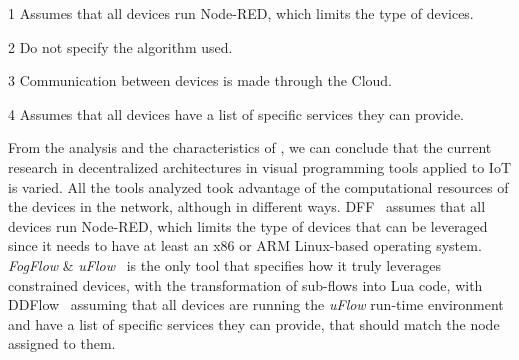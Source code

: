 \begin{table*}[!h]
    \centering
    \begin{threeparttable}
    \caption[Decentralized VPLs applied to IoT and their characteristics.]{Small circles (\textbullet) mean \textit{yes}, hyphens (-) means \textit{no information available}, empty means \textit{no} and asterisk (*) means more than one.}\label{tab:decentralized_sota_results}
    \begin{tablenotes}\footnotesize
        \item[1] Assumes that all devices run Node-RED, which limits the type of devices.
        \item[2] Do not specify the algorithm used.
        \item[3] Communication between devices is made through the Cloud.
        \item[4] Assumes that all devices have a list of specific services they can provide.
    \end{tablenotes}
    \end{threeparttable}
\end{table*}

From the analysis and the characteristics of , we can conclude that the current research in decentralized architectures in visual programming tools applied to IoT is varied. All the tools analyzed took advantage of the computational resources of the devices in the network, although in different ways. DFF~\cite{ddf} assumes that all devices run Node-RED, which limits the type of devices that can be leveraged since it needs to have at least an x86 or ARM Linux-based operating system. \textit{FogFlow} \& \textit{uFlow}~\cite{fog_flow,flow_based_programming_fog} is the only tool that specifies how it truly leverages constrained devices, with the transformation of sub-flows into Lua code, with DDFlow~\cite{ddflow} assuming that all devices are running the \textit{uFlow} run-time environment and have a list of specific services they can provide, that should match the node assigned to them.

